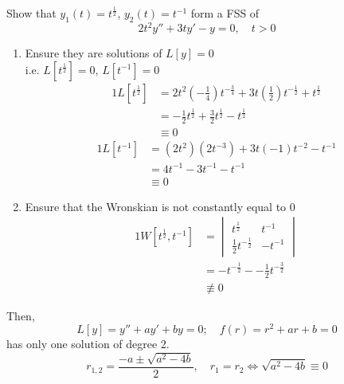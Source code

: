 \documentclass[diffeq.tex]{subfiles}
\begin{document}
    \begin{example}
        Show that $y_{1}(t) = t^{\frac{1}{2}}$, $y_{2}(t) = t^{-1}$ form a FSS of
        \begin{equation}
            2t^{2}y'' + 3ty'-y=0,\quad t > 0
        \end{equation}
        \begin{enumerate}
            \item Ensure they are solutions of $L[y] = 0$\\
            i.e. $L[t^{\frac{1}{2}}] = 0$, $L[t^{-1}] = 0$
            \begin{alignat}{1}
                L[t^{\frac{1}{2}}] &= 2t^{2}(-\frac{1}{4})t^{-\frac{3}{4}}+3t(\frac{1}{2})t^{-\frac{1}{2}} + t^{\frac{1}{2}}\\
                &= -\frac{1}{2}t^{\frac{1}{2}} + \frac{3}{2}t^{\frac{1}{2}}-t^{\frac{1}{2}}\\
                &\equiv 0
            \end{alignat}
            \begin{alignat}{1}
                L[t^{-1}] &= (2t^{2})(2t^{-3}) + 3t(-1)t^{-2}-t^{-1}\\
                &= 4t^{-1} - 3t^{-1} - t^{-1}\\
                &\equiv 0
            \end{alignat}
            \item Ensure that the Wronskian is not constantly equal to 0
            \begin{alignat}{1}
                W[t^{\frac{1}{2}}, t^{-1}] &= \begin{vmatrix}
                    t^{\frac{1}{2}} & t^{-1}\\
                    \frac{1}{2}t^{-\frac{1}{2}} & -t^{-1}
                \end{vmatrix}\\
                &= -t^{-\frac{1}{2}} - -\frac{1}{2}t^{-\frac{3}{2}}\\
                &\nequiv 0
            \end{alignat}
        \end{enumerate}
        Then,
        \begin{equation}
            L[y] = y'' + ay' + by = 0;\quad f(r) = r^{2} + ar + b = 0
        \end{equation}
        has only one solution of degree 2.
        \begin{equation}
            r_{1,2} = \frac{-a\pm\sqrt{a^{2} - 4b}}{2},\quad r_{1} = r_{2} \iff \sqrt{a^{2} - 4b} \equiv 0
        \end{equation}
    \end{example}
\end{document}
